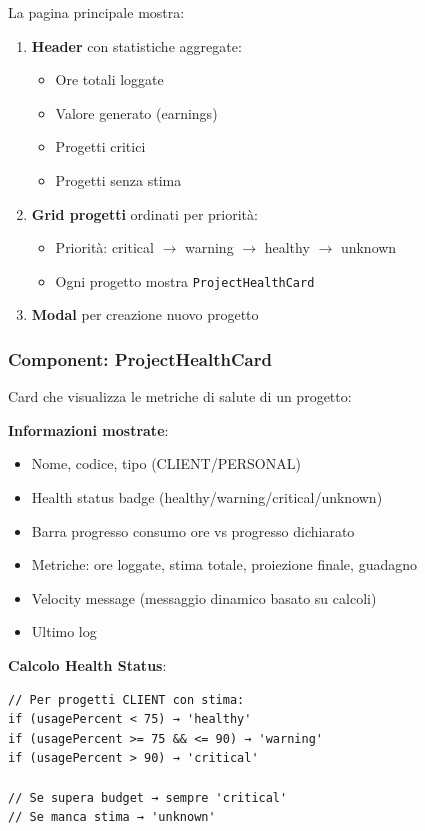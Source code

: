 \documentclass[11pt,a4paper]{article}
\begin{document}
La pagina principale mostra:
\begin{enumerate}
    \item \textbf{Header} con statistiche aggregate:
    \begin{itemize}
        \item Ore totali loggate
        \item Valore generato (earnings)
        \item Progetti critici
        \item Progetti senza stima
    \end{itemize}
    
    \item \textbf{Grid progetti} ordinati per priorità:
    \begin{itemize}
        \item Priorità: critical $\rightarrow$ warning $\rightarrow$ healthy $\rightarrow$ unknown
        \item Ogni progetto mostra \texttt{ProjectHealthCard}
    \end{itemize}
    
    \item \textbf{Modal} per creazione nuovo progetto
\end{enumerate}

\subsubsection{Component: ProjectHealthCard}

Card che visualizza le metriche di salute di un progetto:

\textbf{Informazioni mostrate}:
\begin{itemize}
    \item Nome, codice, tipo (CLIENT/PERSONAL)
    \item Health status badge (healthy/warning/critical/unknown)
    \item Barra progresso consumo ore vs progresso dichiarato
    \item Metriche: ore loggate, stima totale, proiezione finale, guadagno
    \item Velocity message (messaggio dinamico basato su calcoli)
    \item Ultimo log
\end{itemize}

\textbf{Calcolo Health Status}:
\begin{lstlisting}
// Per progetti CLIENT con stima:
if (usagePercent < 75) → 'healthy'
if (usagePercent >= 75 && <= 90) → 'warning'
if (usagePercent > 90) → 'critical'

// Se supera budget → sempre 'critical'
// Se manca stima → 'unknown'
\end{lstlisting}
\end{document}
